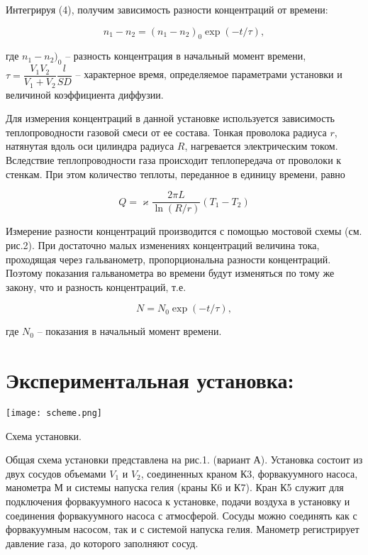 \documentclass[a4paper,12pt]{article}
\theoremstyle{plain} %
\theoremstyle{definition} %
\theoremstyle{remark} %
\begin{document}
    Интегрируя (4), получим зависимость разности концентраций от времени:
    
    \begin{equation}
        n_1 - n_2 = (n_1 - n_2)_0\exp(-t/\tau),
    \end{equation}
    
    где $n_1 - n_2)_0$ -- разность концентрация в начальный момент времени,
    $\tau = \dfrac{V_1V_2}{V_1 + V_2}\dfrac{l}{SD}$ -- характерное время, определяемое параметрами установки и величиной коэффициента диффузии.

    Для измерения концентраций в данной установке используется зависимость теплопроводности газовой смеси от ее состава. Тонкая проволока радиуса $r$, натянутая вдоль оси цилиндра радиуса $R$, нагревается электрическим током. Вследствие теплопроводности газа происходит теплопередача от проволоки к стенкам. При этом количество теплоты, переданное в единицу времени, равно
    
    \begin{equation}
        Q = \varkappa\dfrac{2\pi L}{\ln(R/r)}(T_1 - T_2)
    \end{equation}
    
    Измерение разности концентраций производится с помощью мостовой схемы (см. рис.2). При достаточно малых изменениях концентраций величина тока, проходящая через гальванометр, пропорциональна разности концентраций. Поэтому показания гальванометра во времени будут изменяться по тому же закону, что и разность концентраций, т.е.
    
    \begin{equation}
        N = N_0\exp(-t/\tau),
    \end{equation}
    
    где  $N_0$ -- показания в начальный момент времени.

\newpage

\section{Экспериментальная установка:}

    \begin{center}
        \texttt{[image: scheme.png]}    
        
        Схема установки.
    \end{center}
    
    Общая схема установки представлена на рис.1. (вариант А). 
    Установка состоит из двух сосудов объемами $V_1$ и $V_2$, соединенных краном К3, форвакуумного насоса, манометра М и системы напуска гелия (краны К6 и К7). Кран К5 служит для подключения форвакуумного насоса к установке, подачи воздуха в установку и соединения форвакуумного насоса с атмосферой. Сосуды можно соединять как с форвакуумным насосом, так и с системой напуска гелия. Манометр регистрирует давление газа, до которого заполняют сосуд.
    
\end{document}
